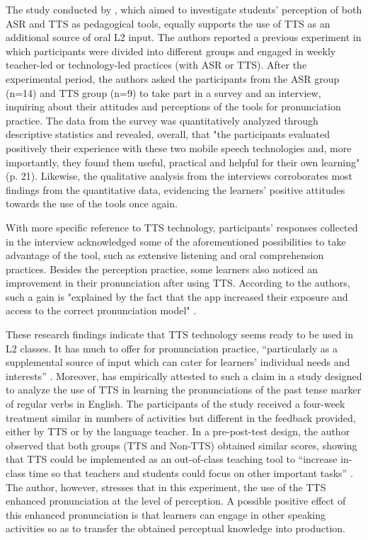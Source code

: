 \documentclass[english]{textolivre}
\begin{document}
The study conducted by \textcite{liakin2017}, which aimed to investigate students' perception of both ASR and TTS as pedagogical tools, equally supports the use of TTS as an additional source of oral L2 input. The authors reported a previous experiment in which participants were divided into different groups and engaged in weekly teacher-led or technology-led practices (with ASR or TTS). After the experimental period, the authors asked the participants from the ASR group (n=14) and TTS group (n=9) to take part in a survey and an interview, inquiring about their attitudes and perceptions of the tools for pronunciation practice. The data from the survey was quantitatively analyzed through descriptive statistics and revealed, overall, that "the participants evaluated positively their experience with these two mobile speech technologies and, more importantly, they found them useful, practical and helpful for their own learning" (p. 21). Likewise, the qualitative analysis from the interviews corroborates most findings from the quantitative data, evidencing the learners' positive attitudes towards the use of the tools once again.

With more specific reference to TTS technology, participants' responses collected in the interview acknowledged some of the aforementioned possibilities to take advantage of the tool, such as extensive listening and oral comprehension practices. Besides the perception practice, some learners also noticed an improvement in their pronunciation after using TTS. According to the authors, such a gain is "explained by the fact that the app increased their exposure and access to the correct pronunciation model" \cite[p. 24]{liakin2017}.

These research findings indicate that TTS technology seems ready to be used in L2 classes. It has much to offer for pronunciation practice, “particularly as a supplemental source of input which can cater for learners’ individual needs and interests” \cite[p. 112]{cardoso2015}. Moreover, \textcite{cardoso2018} has empirically attested to such a claim in a study designed to analyze the use of TTS in learning the pronunciations of the past tense marker of regular verbs in English. The participants of the study received a four-week treatment similar in numbers of activities but different in the feedback provided, either by TTS or by the language teacher. In a pre-post-test design, the author observed that both groups (TTS and Non-TTS) obtained similar scores, showing that TTS could be implemented as an out-of-class teaching tool to “increase in-class time so that teachers and students could focus on other important tasks” \cite[p. 21]{cardoso2018}. The author, however, stresses that in this experiment, the use of the TTS enhanced pronunciation at the level of perception. A possible positive effect of this enhanced pronunciation is that learners can engage in other speaking activities so as to transfer the obtained perceptual knowledge into production.
\end{document}
